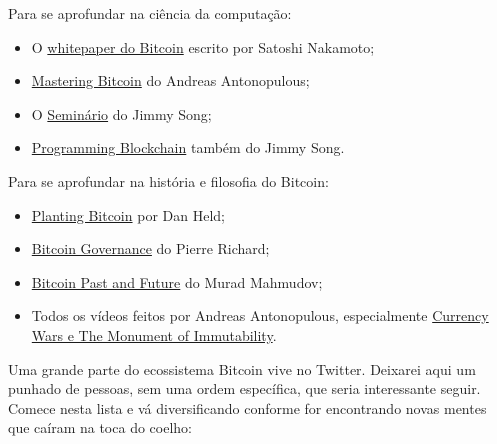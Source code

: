 Para se aprofundar na ciência da computação:

\begin{itemize}
\item O \href{https://bitcoin.org/bitcoin.pdf}{whitepaper do Bitcoin} escrito por Satoshi Nakamoto;
\item \href{https://amzn.to/3gOqaUH}{Mastering Bitcoin} do Andreas Antonopulous;
\item O \href{https://programmingbitcoin.com/#programming-blockchain}{Seminário} do Jimmy Song;
\item \href{https://programmingblockchain.gitbook.io/programmingblockchain/}{Programming Blockchain} também do Jimmy Song.
\end{itemize}

Para se aprofundar na história e filosofia do Bitcoin:

\begin{itemize}
\item \href{https://tinyurl.com/Planting-Bitcoin}{Planting Bitcoin} por Dan Held;
\item \href{https://tinyurl.com/mzy6jkz4}{Bitcoin Governance} do Pierre Richard;
\item \href{https://tinyurl.com/y8vueb88}{Bitcoin Past and Future} do Murad Mahmudov;
\item Todos os vídeos feitos por Andreas Antonopulous, especialmente \href{https://www.youtube.com/user/aantonop}{Currency Wars e The Monument of Immutability}.
\end{itemize}

Uma grande parte do ecossistema Bitcoin vive no Twitter. Deixarei aqui um punhado de pessoas, sem uma ordem específica, que seria interessante seguir. Comece nesta lista e vá diversificando conforme for encontrando novas mentes que caíram na toca do coelho:

